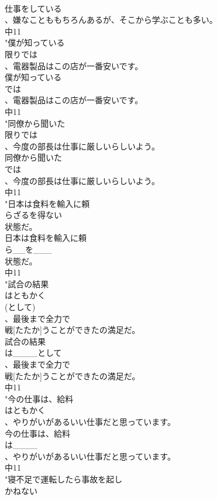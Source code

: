 \documentclass[8pt]{extreport}
\begin{document}
\begin{CJK}{UTF8}{min}
\\	仕事をしている
\\	、嫌なことももちろんあるが、そこから学ぶことも多い。
\\	中11
\\	"僕が知っている
\\	限りでは
\\	、電器製品はこの店が一番安いです。
\\	僕が知っている
\\	では
\\	、電器製品はこの店が一番安いです。
\\	中11
\\	"同僚から聞いた
\\	限りでは
\\	、今度の部長は仕事に厳しいらしいよう。
\\	同僚から聞いた
\\	では
\\	、今度の部長は仕事に厳しいらしいよう。
\\	中11
\\	"日本は食料を輸入に頼
\\	らざるを得ない
\\	状態だ。
\\	日本は食料を輸入に頼
\\	ら__を___
\\	状態だ。
\\	中11
\\	"試合の結果
\\	はともかく
\\	(として)
\\	、最後まで全力で
\\	戦[たたか]うことができたの満足だ。
\\	試合の結果
\\	は____として
\\	、最後まで全力で
\\	戦[たたか]うことができたの満足だ。
\\	中11
\\	"今の仕事は、給料
\\	はともかく
\\	、やりがいがあるいい仕事だと思っています。
\\	今の仕事は、給料
\\	は____
\\	、やりがいがあるいい仕事だと思っています。
\\	中11
\\	"寝不足で運転したら事故を起し
\\	かねない

\end{CJK}
\end{document}
